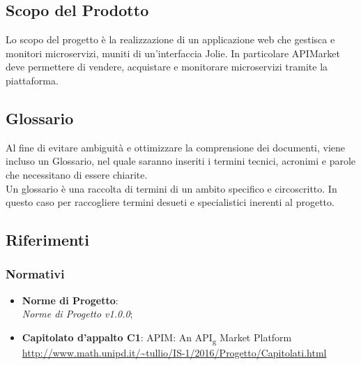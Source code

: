 \documentclass[12pt,a4paper,titlepage]{article}
\begin{document}
	\subsection{Scopo del Prodotto}
	Lo scopo del progetto è la realizzazione di un applicazione web che gestisca e monitori microservizi, muniti di un'interfaccia Jolie. In particolare APIMarket deve permettere di vendere, acquistare e monitorare microservizi tramite la piattaforma.
	
	\subsection{Glossario}
	Al fine di evitare ambiguità e ottimizzare la comprensione dei documenti, viene incluso un Glossario, nel quale saranno inseriti i termini tecnici, acronimi e parole che necessitano di essere chiarite.\\
	Un glossario è una raccolta di termini di un ambito specifico e circoscritto. In questo caso per raccogliere termini desueti e specialistici inerenti al progetto.
	
	\subsection{Riferimenti}
	\subsubsection{Normativi}
	\begin{itemize}
		\item \textbf{Norme di Progetto}:\\
		\textit{Norme di Progetto v1.0.0};
		\item \textbf{Capitolato d'appalto C1}: APIM: An API\textsubscript{g} Market Platform\\
			\textcolor{blue}{\url{http://www.math.unipd.it/~tullio/IS-1/2016/Progetto/Capitolati.html}}
	\end{itemize}
\end{document}

